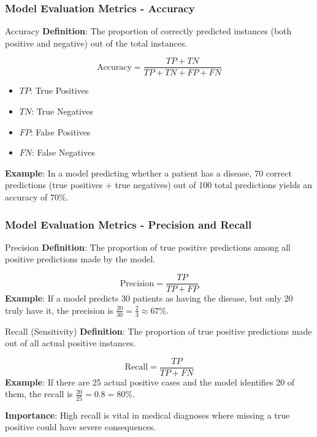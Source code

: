 \documentclass[aspectratio=169]{beamer}
\begin{document}
\begin{frame}[fragile]
    \frametitle{Model Evaluation Metrics - Accuracy}
    \begin{block}{Accuracy}
        \textbf{Definition}: The proportion of correctly predicted instances (both positive and negative) out of the total instances.
    \end{block}
    \begin{equation}
        \text{Accuracy} = \frac{TP + TN}{TP + TN + FP + FN}
    \end{equation}
    \begin{itemize}
        \item \(TP\): True Positives
        \item \(TN\): True Negatives
        \item \(FP\): False Positives
        \item \(FN\): False Negatives
    \end{itemize}
    \textbf{Example}: In a model predicting whether a patient has a disease, 70 correct predictions (true positives + true negatives) out of 100 total predictions yields an accuracy of $70\%$.
\end{frame}

\begin{frame}[fragile]
    \frametitle{Model Evaluation Metrics - Precision and Recall}
    \begin{block}{Precision}
        \textbf{Definition}: The proportion of true positive predictions among all positive predictions made by the model.
    \end{block}
    \begin{equation}
        \text{Precision} = \frac{TP}{TP + FP}
    \end{equation}
    \textbf{Example}: If a model predicts 30 patients as having the disease, but only 20 truly have it, the precision is $\frac{20}{30} = \frac{2}{3} \approx 67\%$.
    
    \begin{block}{Recall (Sensitivity)}
        \textbf{Definition}: The proportion of true positive predictions made out of all actual positive instances.
    \end{block}
    \begin{equation}
        \text{Recall} = \frac{TP}{TP + FN}
    \end{equation}
    \textbf{Example}: If there are 25 actual positive cases and the model identifies 20 of them, the recall is $\frac{20}{25} = 0.8 = 80\%$.
    
    \textbf{Importance}: High recall is vital in medical diagnoses where missing a true positive could have severe consequences.
\end{frame}
\end{document}

